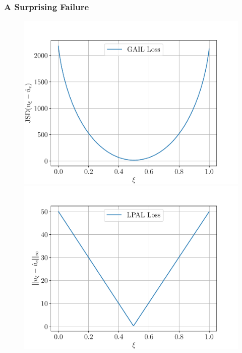 \documentclass{beamer}
\begin{document}
\begin{frame}
\frametitle{A Surprising Failure}
\begin{figure}
  \begin{center}
  \begin{minipage}{0.46\linewidth}
    \centering
    \includegraphics[width=\linewidth]{plots/all_state/gail_loss.pdf}
  \end{minipage}
  \hspace{0.05\linewidth}
  \begin{minipage}{0.46\linewidth}
    \centering
    \includegraphics[width=\linewidth]{plots/all_state/lpal_loss.pdf}
  \end{minipage}
  \end{center}
\end{figure}
\end{frame}
\end{document}
